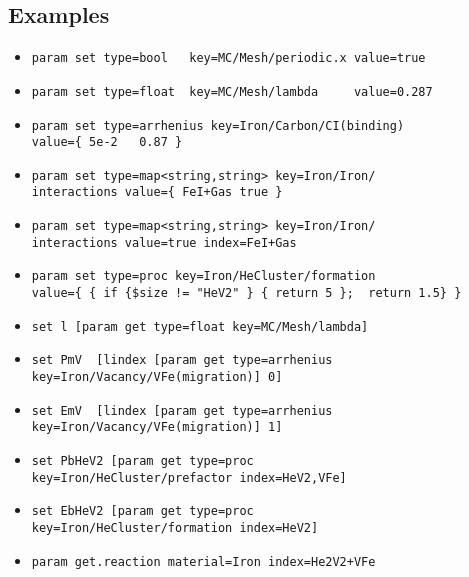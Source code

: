 \subsection{Examples}
\begin{itemize}
\item \verb+param set type=bool   key=MC/Mesh/periodic.x value=true+
\item \verb+param set type=float  key=MC/Mesh/lambda     value=0.287+
\item \verb+param set type=arrhenius key=Iron/Carbon/CI(binding)+ \hfill \\\verb+value={ 5e-2   0.87 }+
\item \verb-param set type=map<string,string> key=Iron/Iron/- \hfill \\ \verb-interactions value={ FeI+Gas true }-
\item \verb-param set type=map<string,string> key=Iron/Iron/- \hfill \\ \verb-interactions value=true index=FeI+Gas-
\item \verb+param set type=proc key=Iron/HeCluster/formation+ \hfill \\ \verb+value={ { if {$size != "HeV2" } { return 5 };  return 1.5} }+
\item \verb+set l [param get type=float key=MC/Mesh/lambda]+
\item \verb+set PmV  [lindex [param get type=arrhenius+ \hfill \\ \verb+key=Iron/Vacancy/VFe(migration)] 0]+
\item \verb+set EmV  [lindex [param get type=arrhenius + \hfill \\ \verb+key=Iron/Vacancy/VFe(migration)] 1]+
\item \verb-set PbHeV2 [param get type=proc - \hfill \\ \verb-key=Iron/HeCluster/prefactor index=HeV2,VFe]-
\item \verb-set EbHeV2 [param get type=proc - \hfill \\ \verb-key=Iron/HeCluster/formation index=HeV2]-
\item \verb-param get.reaction material=Iron index=He2V2+VFe-
\end{itemize}
